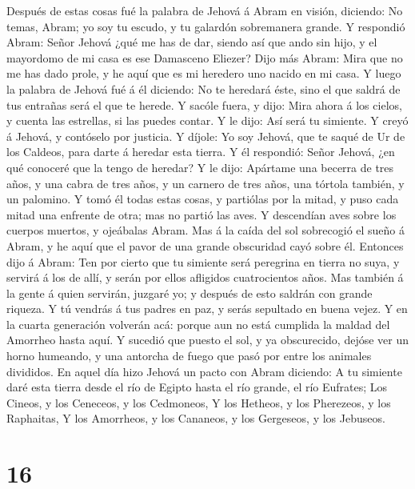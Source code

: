  Después de estas cosas fué la palabra de Jehová á Abram
en visión, diciendo: No temas, Abram; yo soy tu escudo, y tu galardón
sobremanera grande.  Y respondió Abram: Señor Jehová ¿qué
me has de dar, siendo así que ando sin hijo, y el mayordomo de mi casa
es ese Damasceno Eliezer?  Dijo más Abram: Mira que no me
has dado prole, y he aquí que es mi heredero uno nacido en mi casa.
 Y luego la palabra de Jehová fué á él diciendo: No te
heredará éste, sino el que saldrá de tus entrañas será el que te herede.
 Y sacóle fuera, y dijo: Mira ahora á los cielos, y cuenta
las estrellas, si las puedes contar. Y le dijo: Así será tu simiente.
 Y creyó á Jehová, y contóselo por justicia.
 Y díjole: Yo soy Jehová, que te saqué de Ur de los
Caldeos, para darte á heredar esta tierra.  Y él
respondió: Señor Jehová, ¿en qué conoceré que la tengo de heredar?
 Y le dijo: Apártame una becerra de tres años, y una cabra
de tres años, y un carnero de tres años, una tórtola también, y un
palomino.  Y tomó él todas estas cosas, y partiólas por
la mitad, y puso cada mitad una enfrente de otra; mas no partió las
aves.  Y descendían aves sobre los cuerpos muertos, y
ojeábalas Abram.  Mas á la caída del sol sobrecogió el
sueño á Abram, y he aquí que el pavor de una grande obscuridad cayó
sobre él.  Entonces dijo á Abram: Ten por cierto que tu
simiente será peregrina en tierra no suya, y servirá á los de allí, y
serán por ellos afligidos cuatrocientos años.  Mas
también á la gente á quien servirán, juzgaré yo; y después de esto
saldrán con grande riqueza.  Y tú vendrás á tus padres en
paz, y serás sepultado en buena vejez.  Y en la cuarta
generación volverán acá: porque aun no está cumplida la maldad del
Amorrheo hasta aquí.  Y sucedió que puesto el sol, y ya
obscurecido, dejóse ver un horno humeando, y una antorcha de fuego que
pasó por entre los animales divididos.  En aquel día hizo
Jehová un pacto con Abram diciendo: A tu simiente daré esta tierra desde
el río de Egipto hasta el río grande, el río Eufrates; 
Los Cineos, y los Ceneceos, y los Cedmoneos,  Y los
Hetheos, y los Pherezeos, y los Raphaitas,  Y los
Amorrheos, y los Cananeos, y los Gergeseos, y los Jebuseos.

\hypertarget{section-15}{%
\section{16}\label{section-15}}

